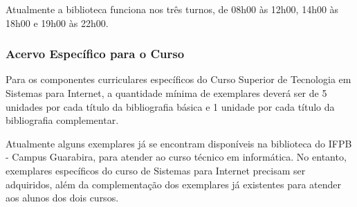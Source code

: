 	Atualmente a biblioteca funciona nos três turnos, de 08h00 às 12h00, 14h00 às 18h00 e 19h00 às 22h00.

\subsubsection{Acervo Específico para o Curso}

	Para os componentes curriculares específicos do Curso Superior de Tecnologia em Sistemas para Internet, a quantidade mínima de exemplares deverá ser de 5 unidades por cada título da bibliografia básica e 1 unidade por cada título da bibliografia complementar.
	
	Atualmente alguns exemplares já se encontram disponíveis na biblioteca do IFPB - Campus Guarabira, para atender ao curso técnico em informática. No entanto, exemplares específicos do curso de Sistemas para Internet precisam ser adquiridos, além da complementação dos exemplares já existentes para atender aos alunos dos dois cursos.

